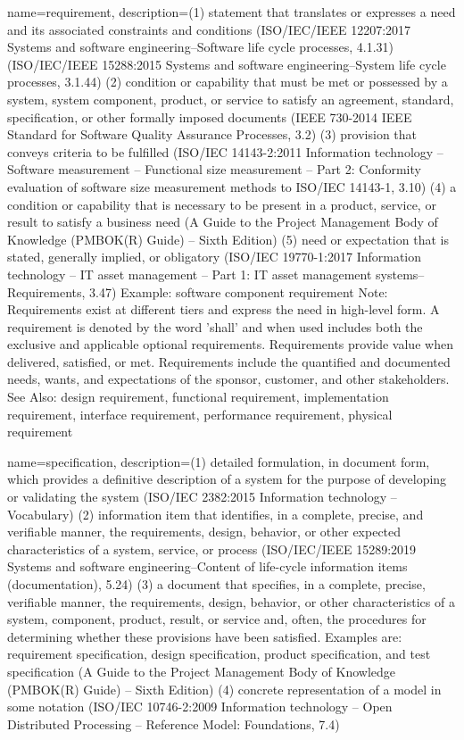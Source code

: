 {
    name={requirement},
    description={(1) statement that translates or expresses a need and its associated constraints and conditions (ISO/IEC/IEEE 12207:2017 Systems and software engineering--Software life cycle processes, 4.1.31) (ISO/IEC/IEEE 15288:2015 Systems and software engineering--System life cycle processes, 3.1.44) (2) condition or capability that must be met or possessed by a system, system component, product, or service to satisfy an agreement, standard, specification, or other formally imposed documents (IEEE 730-2014 IEEE Standard for Software Quality Assurance Processes, 3.2) (3) provision that conveys criteria to be fulfilled (ISO/IEC 14143-2:2011 Information technology -- Software measurement -- Functional size measurement -- Part 2: Conformity evaluation of software size measurement methods to ISO/IEC 14143-1, 3.10) (4) a condition or capability that is necessary to be present in a product, service, or result to satisfy a business need (A Guide to the Project Management Body of Knowledge (PMBOK(R) Guide) -- Sixth Edition) (5) need or expectation that is stated, generally implied, or obligatory (ISO/IEC 19770-1:2017 Information technology -- IT asset management -- Part 1: IT asset management systems--Requirements, 3.47) Example: software component requirement Note: Requirements exist at different tiers and express the need in high-level form. A requirement is denoted by the word 'shall' and when used includes both the exclusive and applicable optional requirements. Requirements provide value when delivered, satisfied, or met. Requirements include the quantified and documented needs, wants, and expectations of the sponsor, customer, and other stakeholders. See Also: design requirement, functional requirement, implementation requirement, interface requirement, performance requirement, physical requirement}
}

{
    name={specification},
    description={(1) detailed formulation, in document form, which provides a definitive description of a system for the purpose of developing or validating the system (ISO/IEC 2382:2015 Information technology -- Vocabulary) (2) information item that identifies, in a complete, precise, and verifiable manner, the requirements, design, behavior, or other expected characteristics of a system, service, or process (ISO/IEC/IEEE 15289:2019 Systems and software engineering--Content of life-cycle information items (documentation), 5.24) (3) a document that specifies, in a complete, precise, verifiable manner, the requirements, design, behavior, or other characteristics of a system, component, product, result, or service and, often, the procedures for determining whether these provisions have been satisfied. Examples are: requirement specification, design specification, product specification, and test specification (A Guide to the Project Management Body of Knowledge (PMBOK(R) Guide) -- Sixth Edition) (4) concrete representation of a model in some notation (ISO/IEC 10746-2:2009 Information technology -- Open Distributed Processing -- Reference Model: Foundations, 7.4)}
}

